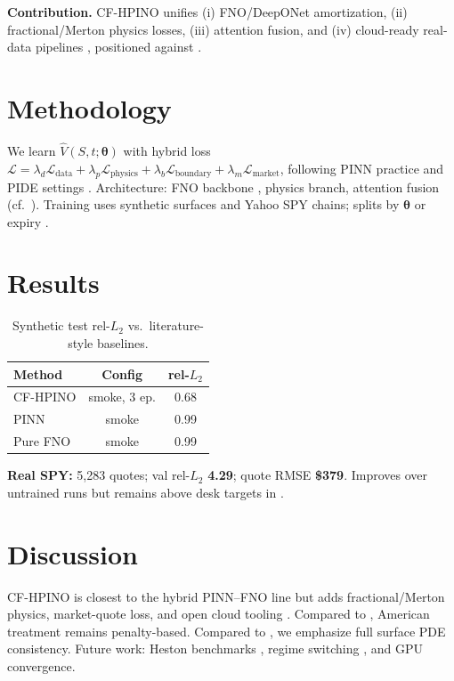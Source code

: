 \documentclass[10pt,a4paper]{article}
\begin{document}
\textbf{Contribution.} CF-HPINO unifies (i) FNO/DeepONet amortization, (ii) fractional/Merton physics losses, (iii) attention fusion, and (iv) cloud-ready real-data pipelines \cite{cfhpino2026repo}, positioned against \cite{ref04_elbayed2025,ref01_dhiman2023,ref03_gatta2023}.

\section{Methodology}

We learn $\hat{V}(S,t;\boldsymbol{\theta})$ with hybrid loss $\mathcal{L}=\lambda_d\mathcal{L}_{\mathrm{data}}+\lambda_p\mathcal{L}_{\mathrm{physics}}+\lambda_b\mathcal{L}_{\mathrm{boundary}}+\lambda_m\mathcal{L}_{\mathrm{market}}$, following PINN practice \cite{raissi2019physics,ref01_dhiman2023} and PIDE settings \cite{ref02_bansal2025,ref09_illiquid2025}. Architecture: FNO backbone \cite{ref04_elbayed2025,ref07_feng2025}, physics branch, attention fusion (cf.\ \cite{ref14_sharma2026}). Training uses synthetic surfaces and Yahoo SPY chains; splits by $\boldsymbol{\theta}$ or expiry \cite{ref11_pande2025}.

\section{Results}

\begin{table}[h]
\centering
\caption{Synthetic test rel-$L_2$ vs.\ literature-style baselines.}
\label{tab:r}
\begin{tabular}{lcc}
\toprule
Method & Config & rel-$L_2$ \\
\midrule
CF-HPINO & smoke, 3 ep. & 0.68 \\
PINN \cite{ref01_dhiman2023} & smoke & 0.99 \\
Pure FNO \cite{ref04_elbayed2025} & smoke & 0.99 \\
\bottomrule
\end{tabular}
\end{table}

\noindent\textbf{Real SPY:} 5,283 quotes; val rel-$L_2$ \textbf{4.29}; quote RMSE \textbf{\$379}. Improves over untrained runs but remains above desk targets in \cite{ref08_hainaut2024,ref11_pande2025}.

\section{Discussion}

CF-HPINO is closest to the hybrid PINN--FNO line \cite{ref04_elbayed2025} but adds fractional/Merton physics, market-quote loss, and open cloud tooling \cite{cfhpino2026repo}. Compared to \cite{ref03_gatta2023,ref12_sun2025}, American treatment remains penalty-based. Compared to \cite{ref15_liu2024kan,ref13_wiedemann2024}, we emphasize full surface PDE consistency. Future work: Heston benchmarks \cite{ref08_hainaut2024}, regime switching \cite{ref11_pande2025}, and GPU convergence.
\end{document}
